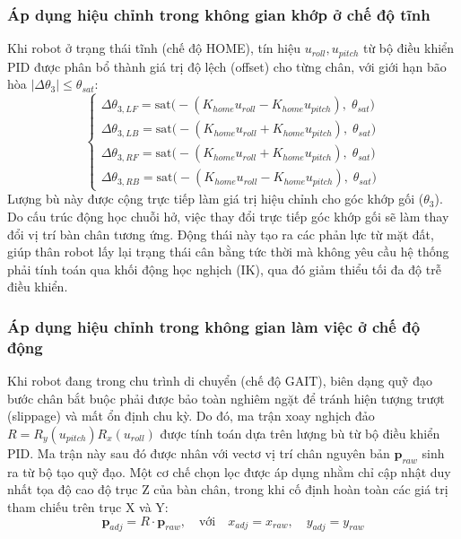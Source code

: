 \subsubsection*{Áp dụng hiệu chỉnh trong không gian khớp ở chế độ tĩnh}
Khi robot ở trạng thái tĩnh (chế độ HOME), tín hiệu $u_{roll}, u_{pitch}$ từ bộ điều khiển PID được phân bổ thành giá trị độ lệch (offset) cho từng chân, với giới hạn bão hòa $|\Delta\theta_3| \leq \theta_{sat}$:
\begin{equation}
\begin{cases} 
\Delta\theta_{3,LF} = \mathrm{sat}\big(- (K_{home} u_{roll} - K_{home} u_{pitch}),\; \theta_{sat}\big) \\
\Delta\theta_{3,LB} = \mathrm{sat}\big(- (K_{home} u_{roll} + K_{home} u_{pitch}),\; \theta_{sat}\big) \\
\Delta\theta_{3,RF} = \mathrm{sat}\big(- (K_{home} u_{roll} + K_{home} u_{pitch}),\; \theta_{sat}\big) \\
\Delta\theta_{3,RB} = \mathrm{sat}\big(- (K_{home} u_{roll} - K_{home} u_{pitch}),\; \theta_{sat}\big) 
\end{cases}
\end{equation}
Lượng bù này được cộng trực tiếp làm giá trị hiệu chỉnh cho góc khớp gối ($\theta_3$). Do cấu trúc động học chuỗi hở, việc thay đổi trực tiếp góc khớp gối sẽ làm thay đổi vị trí bàn chân tương ứng. Động thái này tạo ra các phản lực từ mặt đất, giúp thân robot lấy lại trạng thái cân bằng tức thời mà không yêu cầu hệ thống phải tính toán qua khối động học nghịch (IK), qua đó giảm thiểu tối đa độ trễ điều khiển.

\subsubsection*{Áp dụng hiệu chỉnh trong không gian làm việc ở chế độ động}
Khi robot đang trong chu trình di chuyển (chế độ GAIT), biên dạng quỹ đạo bước chân bắt buộc phải được bảo toàn nghiêm ngặt để tránh hiện tượng trượt (slippage) và mất ổn định chu kỳ. Do đó, ma trận xoay nghịch đảo $R = R_y(u_{pitch}) R_x(u_{roll})$ được tính toán dựa trên lượng bù từ bộ điều khiển PID. Ma trận này sau đó được nhân với vectơ vị trí chân nguyên bản $\mathbf{p}_{raw}$ sinh ra từ bộ tạo quỹ đạo. Một cơ chế chọn lọc được áp dụng nhằm chỉ cập nhật duy nhất tọa độ cao độ trục Z của bàn chân, trong khi cố định hoàn toàn các giá trị tham chiếu trên trục X và Y:
\begin{equation}
\mathbf{p}_{adj} = R \cdot \mathbf{p}_{raw}, \quad \text{với} \quad x_{adj} = x_{raw}, \quad y_{adj} = y_{raw}
\end{equation}

